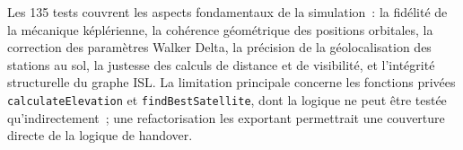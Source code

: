 \documentclass[12pt,a4paper]{article}
\begin{document}
Les 135 tests couvrent les aspects fondamentaux de la simulation~: la fidélité de la mécanique képlérienne, la cohérence géométrique des positions orbitales, la correction des paramètres Walker Delta, la précision de la géolocalisation des stations au sol, la justesse des calculs de distance et de visibilité, et l'intégrité structurelle du graphe ISL. La limitation principale concerne les fonctions privées \texttt{calculateElevation} et \texttt{findBestSatellite}, dont la logique ne peut être testée qu'indirectement~; une refactorisation les exportant permettrait une couverture directe de la logique de handover.
\end{document}
